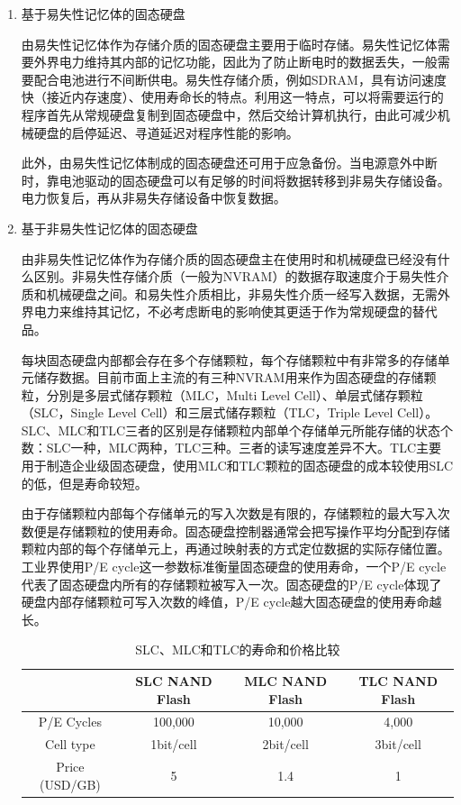 \begin{enumerate}
\item 基于易失性记忆体的固态硬盘

由易失性记忆体作为存储介质的固态硬盘主要用于临时存储。易失性记忆体需要外界电力维持其内部的记忆功能，因此为了防止断电时的数据丢失，一般需要配合电池进行不间断供电。易失性存储介质，例如SDRAM，具有访问速度快（接近内存速度）、使用寿命长的特点。利用这一特点，可以将需要运行的程序首先从常规硬盘复制到固态硬盘中，然后交给计算机执行，由此可减少机械硬盘的启停延迟、寻道延迟对程序性能的影响。

此外，由易失性记忆体制成的固态硬盘还可用于应急备份。当电源意外中断时，靠电池驱动的固态硬盘可以有足够的时间将数据转移到非易失存储设备。电力恢复后，再从非易失存储设备中恢复数据。

\item 基于非易失性记忆体的固态硬盘

由非易失性记忆体作为存储介质的固态硬盘主在使用时和机械硬盘已经没有什么区别。非易失性存储介质（一般为NVRAM）的数据存取速度介于易失性介质和机械硬盘之间。和易失性介质相比，非易失性介质一经写入数据，无需外界电力来维持其记忆，不必考虑断电的影响使其更适于作为常规硬盘的替代品。

每块固态硬盘内部都会存在多个存储颗粒，每个存储颗粒中有非常多的存储单元储存数据。目前市面上主流的有三种NVRAM用来作为固态硬盘的存储颗粒，分別是多层式储存颗粒（MLC，Multi Level Cell）、单层式储存颗粒（SLC，Single Level Cell）和三层式储存颗粒（TLC，Triple Level Cell）。SLC、MLC和TLC三者的区别是存储颗粒内部单个存储单元所能存储的状态个数：SLC一种，MLC两种，TLC三种。三者的读写速度差异不大。TLC主要用于制造企业级固态硬盘，使用MLC和TLC颗粒的固态硬盘的成本较使用SLC的低，但是寿命较短。

由于存储颗粒内部每个存储单元的写入次数是有限的，存储颗粒的最大写入次数便是存储颗粒的使用寿命。固态硬盘控制器通常会把写操作平均分配到存储颗粒内部的每个存储单元上，再通过映射表的方式定位数据的实际存储位置。工业界使用P/E cycle这一参数标准衡量固态硬盘的使用寿命，一个P/E cycle代表了固态硬盘内所有的存储颗粒被写入一次。固态硬盘的P/E cycle体现了硬盘内部存储颗粒可写入次数的峰值，P/E cycle越大固态硬盘的使用寿命越长。

\begin{table}[htb]
\centering
\caption{SLC、MLC和TLC的寿命和价格比较}
\begin{tabular}{|c|c|c|c|}
\hline  & SLC NAND Flash & MLC NAND Flash & TLC NAND Flash \\
\hline P/E Cycles & 100,000 & 10,000 & 4,000 \\
\hline Cell type & 1bit/cell & 2bit/cell & 3bit/cell \\
\hline Price (USD/GB) & 5 & 1.4 & 1 \\
\hline
\end{tabular}
\label{tab:slc-mlc-tlc-compare}
\end{table}


\end{enumerate}
